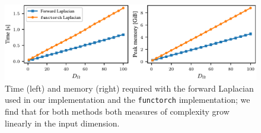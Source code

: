 \documentclass{article}
\begin{document}
\begin{figure}
    \centering
    \includegraphics[width=\linewidth]{figures/laplacian_benchmark.pdf}
    \caption{Time (left) and memory (right) required with the forward Laplacian used in our implementation and the \texttt{functorch} implementation; we find that for both methods both measures of complexity grow linearly in the input dimension.}
    \label{fig:enter-label}
\end{figure}
\end{document}
